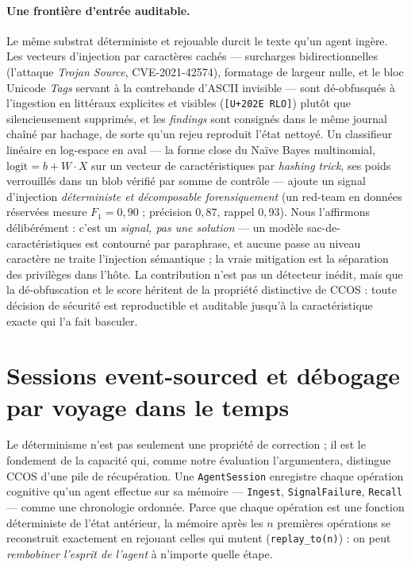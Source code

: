 \documentclass[11pt]{article}
\newcommand{\code}[1]{\texttt{#1}}
\begin{document}
\paragraph{Une frontière d'entrée auditable.} Le même substrat déterministe et
rejouable durcit le texte qu'un agent ingère. Les vecteurs d'injection par
caractères cachés --- surcharges bidirectionnelles (l'attaque \emph{Trojan
Source}, CVE-2021-42574), formatage de largeur nulle, et le bloc Unicode
\emph{Tags} servant à la contrebande d'ASCII invisible --- sont dé-obfusqués à
l'ingestion en littéraux explicites et visibles (\code{[U+202E RLO]}) plutôt que
silencieusement supprimés, et les \emph{findings} sont consignés dans le même
journal chaîné par hachage, de sorte qu'un rejeu reproduit l'état nettoyé. Un
classifieur linéaire en log-espace en aval --- la forme close du Naïve Bayes
multinomial, $\mathrm{logit}=b+W\!\cdot\!X$ sur un vecteur de caractéristiques
par \emph{hashing trick}, ses poids verrouillés dans un blob vérifié par somme de
contrôle --- ajoute un signal d'injection \emph{déterministe et décomposable
forensiquement} (un red-team en données réservées mesure $F_1=0{,}90$ ; précision
$0{,}87$, rappel $0{,}93$). Nous l'affirmons délibérément : c'est un \emph{signal,
pas une solution} --- un modèle sac-de-caractéristiques est contourné par
paraphrase, et aucune passe au niveau caractère ne traite l'injection sémantique ;
la vraie mitigation est la séparation des privilèges dans l'hôte. La contribution
n'est pas un détecteur inédit, mais que la dé-obfuscation et le score héritent de
la propriété distinctive de CCOS : toute décision de sécurité est reproductible et
auditable jusqu'à la caractéristique exacte qui l'a fait basculer.

\section{Sessions event-sourced et débogage par voyage dans le temps}\label{sec:timetravel}

Le déterminisme n'est pas seulement une propriété de correction ; il est le fondement
de la capacité qui, comme notre évaluation l'argumentera, distingue CCOS d'une pile
de récupération. Une \code{AgentSession} enregistre chaque opération cognitive qu'un
agent effectue sur sa mémoire --- \code{Ingest}, \code{SignalFailure}, \code{Recall}
--- comme une chronologie ordonnée. Parce que chaque opération est une fonction
déterministe de l'état antérieur, la mémoire après les $n$ premières opérations se
reconstruit exactement en rejouant celles qui mutent (\code{replay\_to(n)}) : on peut
\emph{rembobiner l'esprit de l'agent} à n'importe quelle étape.
\end{document}
